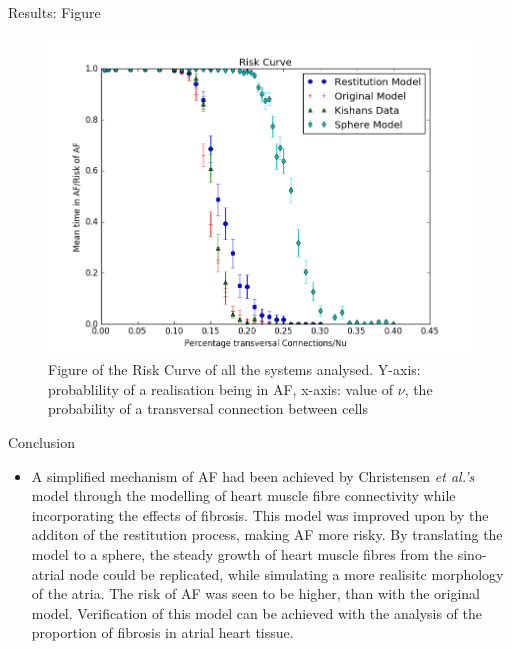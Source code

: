 \documentclass[final,hyperref={pdfpagelabels=false}]{beamer}
\begin{document}
\begin{frame}[t]
\begin{columns}[t]
\begin{column}{.465\textwidth}
\begin{block}{Results: Figure}
\begin{figure}
\includegraphics[width=0.8\linewidth]{xriskcurvesphere}
\caption{Figure of the Risk Curve of all the systems analysed. Y-axis: probablility of a realisation being in AF, x-axis: value of $\nu$, the  probability of a transversal connection between cells}
\end{figure}

\end{block}


\begin{block}{Conclusion}
\begin{itemize}
\item A simplified mechanism of AF had been achieved by Christensen \emph{et al.'s} model through the modelling of heart muscle fibre connectivity while incorporating the effects of fibrosis. This model was improved upon by the additon of the restitution process, making AF more risky. By translating the model to a sphere, the steady growth of heart muscle fibres from the sino-atrial node could be replicated, while simulating a more realisitc morphology of the atria. The risk of AF was seen to be higher, than with the original model. Verification of this model can be achieved with the analysis of the proportion of fibrosis in atrial heart tissue. 
\end{itemize}
\end{block}



\end{column}
\end{columns}
\end{frame}
\end{document}
